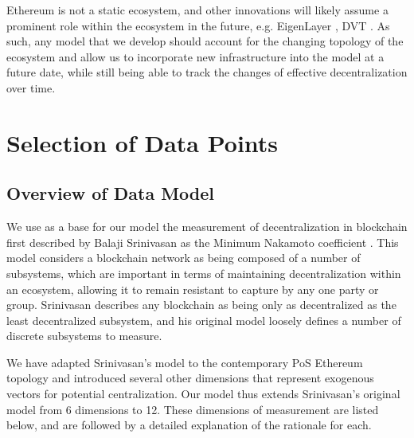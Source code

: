 \documentclass[conference]{IEEEtran}
\begin{document}
Ethereum is not a static ecosystem, and other innovations will likely assume a prominent role within the ecosystem in the future, e.g. EigenLayer \cite{eigenlayer2023}, DVT \cite{asgaonkar-2021}.  As such, any model that we develop should account for the changing topology of the ecosystem and allow us to incorporate new infrastructure into the model at a future date, while still being able to track the changes of effective decentralization over time.

\section{Selection of Data Points}

\subsection{Overview of Data Model}

We use as a base for our model the measurement of decentralization in blockchain first described by Balaji Srinivasan as the Minimum Nakamoto coefficient \cite{srinivasan2018}.  This model considers a blockchain network as being composed of a number of subsystems, which are important in terms of maintaining decentralization within an ecosystem, allowing it to remain resistant to capture by any one party or group.  Srinivasan describes any blockchain as being only as decentralized as the least decentralized subsystem, and his original model loosely defines a number of discrete subsystems to measure.

We have adapted Srinivasan's model to the contemporary PoS Ethereum topology and introduced several other dimensions that represent exogenous vectors for potential centralization.  Our model thus extends Srinivasan's original model from 6 dimensions to 12.  These dimensions of measurement are listed below, and are followed by a detailed explanation of the rationale for each.

\vspace{8pt}
\end{document}
